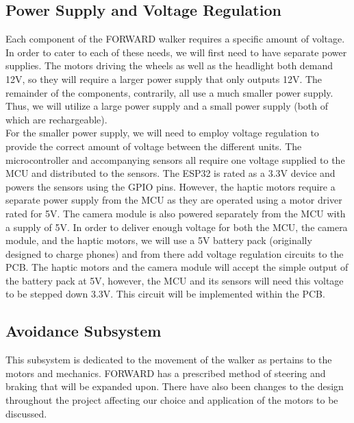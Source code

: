 \subsection{Power Supply and Voltage Regulation}
\noindent Each component of the FORWARD walker requires a specific amount of voltage. In order to cater to each of these needs, we will first need to have separate power supplies. The motors driving the wheels as well as the headlight both demand 12V, so they will require a larger power supply that only outputs 12V. The remainder of the components, contrarily, all use a much smaller power supply. Thus, we will utilize a large power supply and a small power supply (both of which are rechargeable).\\

\noindent For the smaller power supply, we will need to employ voltage regulation to provide the correct amount of voltage between the different units. The microcontroller and accompanying sensors all require one voltage supplied to the MCU and distributed to the sensors. The ESP32 is rated as a 3.3V device\cite{sparkfun12024} and powers the sensors using the GPIO pins. However, the haptic motors require a separate power supply from the MCU as they are operated using a motor driver rated for 5V. The camera module is also powered separately from the MCU with a supply of 5V. In order to deliver enough voltage for both the MCU, the camera module, and the haptic motors, we will use a 5V battery pack (originally designed to charge phones) and from there add voltage regulation circuits to the PCB. The haptic motors and the camera module will accept the simple output of the battery pack at 5V, however, the MCU and its sensors will need this voltage to be stepped down 3.3V. This circuit will be implemented within the PCB.\\

\subsection{Avoidance Subsystem}

\noindent This subsystem is dedicated to the movement of the walker as pertains to the motors and mechanics. FORWARD has a prescribed method of steering and braking that will be expanded upon. There have also been changes to the design throughout the project affecting our choice and application of the motors to be discussed.\\

